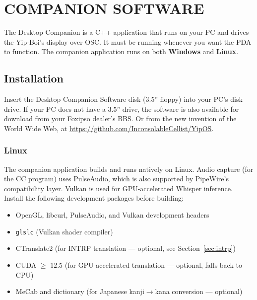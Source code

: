\documentclass[10pt]{article}
\begin{document}


\newpage
\section{COMPANION SOFTWARE}
\label{sec:companion}

The Desktop Companion is a C++ application that runs on your PC and drives the Yip-Boi's display over OSC. It must be running whenever you want the PDA to function. The companion application runs on both \textbf{Windows} and \textbf{Linux}.

\subsection{Installation}

Insert the Desktop Companion Software disk (3.5'' floppy) into your PC's disk drive. If your PC does not have a 3.5'' drive, the software is also available for download from your Foxipso dealer's BBS. Or from the new invention of the World Wide Web, at \url{https://github.com/InconsolableCellist/YipOS}.

\subsubsection*{Linux}

The companion application builds and runs natively on Linux. Audio capture (for the CC program) uses PulseAudio, which is also supported by PipeWire's compatibility layer. Vulkan is used for GPU-accelerated Whisper inference. Install the following development packages before building:

\begin{itemize}[leftmargin=2em, nosep]
  \item OpenGL, libcurl, PulseAudio, and Vulkan development headers
  \item \texttt{glslc} (Vulkan shader compiler)
  \item CTranslate2 (for INTRP translation --- optional, see Section~\ref{sec:intrp})
  \item CUDA $\geq$ 12.5 (for GPU-accelerated translation --- optional, falls back to CPU)
  \item MeCab and dictionary (for Japanese kanji$\rightarrow$kana conversion --- optional)
\end{itemize}
\end{document}
